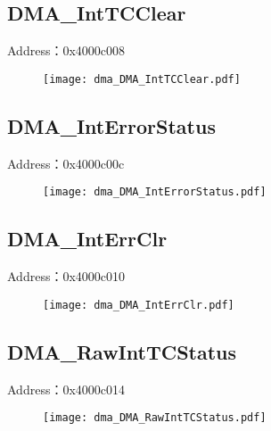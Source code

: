 \subsection{DMA\_IntTCClear}
\label{dma-DMA-IntTCClear}
Address：0x4000c008
 \begin{figure}[H]
\texttt{[image: dma\_DMA\_IntTCClear.pdf]}
\end{figure}

\subsection{DMA\_IntErrorStatus}
\label{dma-DMA-IntErrorStatus}
Address：0x4000c00c
 \begin{figure}[H]
\texttt{[image: dma\_DMA\_IntErrorStatus.pdf]}
\end{figure}

\subsection{DMA\_IntErrClr}
\label{dma-DMA-IntErrClr}
Address：0x4000c010
 \begin{figure}[H]
\texttt{[image: dma\_DMA\_IntErrClr.pdf]}
\end{figure}

\subsection{DMA\_RawIntTCStatus}
\label{dma-DMA-RawIntTCStatus}
Address：0x4000c014
 \begin{figure}[H]
\texttt{[image: dma\_DMA\_RawIntTCStatus.pdf]}
\end{figure}


